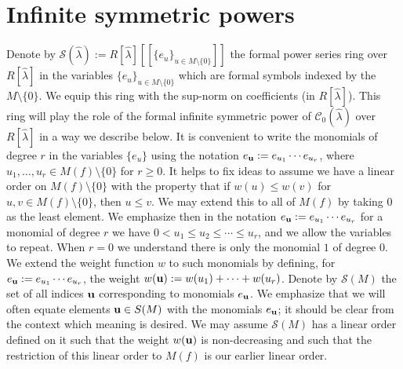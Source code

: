 \documentclass{article}
\theoremstyle{remark}
\def\c #1{ {\mathcal #1} }
\def\b #1{ {\bf #1} }
\begin{document}
\section{Infinite symmetric powers}\label{S: inf sum pow}

Denote by $\c S(\hat \lambda) := R[\hat \lambda][[ \{e_u\}_{u \in M \setminus \{0\}}]]$ the formal power series ring over $R[\hat \lambda]$ in the variables $\{e_u \}_{u \in M \setminus \{0\}}$ which are formal symbols indexed by the $M \setminus \{0\}$.  We equip this ring  with the sup-norm on coefficients (in $R[\hat \lambda]$). This ring will play the role of the formal infinite symmetric power of $\c C_0(\hat \lambda) $ over $R[\hat \lambda]$ in a way we describe below. It is convenient to write the monomials of degree $r$ in the variables $\{ e_u \}$ using the notation $e_{\b u} := e_{u_1} \cdots e_{u_r}$, where $u_1, \ldots, u_r \in M(f) \setminus \{0\}$ for  $r \geq 0$. It helps to fix ideas to assume we have a linear order on $M(f) \setminus \{0\}$ with the property that if $w(u) \leq w(v)$ for $u, v \in M(f) \setminus \{0\}$, then $u \leq v$. We may extend this to all of $M(f)$ by taking $0$ as the least element. We emphasize then in the notation $e_{\b u} := e_{u_1} \cdots e_{u_r}$ for a monomial of degree $r$ we have $0 < u_1 \leq u_2 \leq \cdots \leq u_r$, and we allow the variables to repeat. When $r = 0$ we understand there is only the monomial $1$ of degree 0. We extend the weight function $w$ to such monomials by defining, for $e_{\b u} := e_{u_1} \cdots e_{u_r}$, the weight $w(\b u) := w(u_1) + \cdots + w(u_r)$. Denote by $\c S(M)$ the set of all indices $\b u$ corresponding to monomials $e_{\b u}$. We emphasize that we will often equate elements $\b u \in S(M)$ with the monomials $e_{\b u}$; it should be clear from the context which meaning is desired. We may assume $\c S(M)$ has a linear order defined on it such that the weight $w(\b u)$ is non-decreasing and such that the restriction of this linear order to $M(f)$ is our earlier linear order. 
\end{document}
